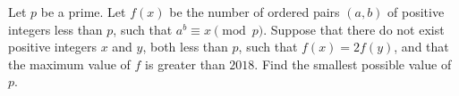 Let $p$ be a prime. Let $f(x)$ be the number of ordered pairs $(a, b)$ of positive integers less than $p$,  such that $a^b \equiv x \pmod p$. Suppose that there do not exist positive integers $x$ and $y$,  both less than $p$,  such that $f(x) = 2f(y)$,  and that the maximum value of $f$ is greater than $2018$. Find the smallest possible value of $p$.